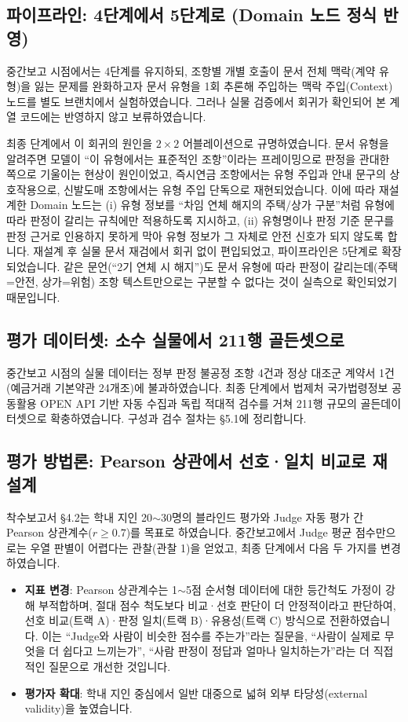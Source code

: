 \documentclass[10pt,a4paper]{article}
\begin{document}
\subsection{파이프라인: 4단계에서 5단계로 (Domain 노드 정식 반영)}
중간보고 시점에서는 4단계를 유지하되, 조항별 개별 호출이 문서 전체 맥락(계약 유형)을 잃는 문제를 완화하고자 문서 유형을 1회 추론해 주입하는 맥락 주입(Context) 노드를 별도 브랜치에서 실험하였습니다. 그러나 실물 검증에서 회귀가 확인되어 본 계열 코드에는 반영하지 않고 보류하였습니다.

최종 단계에서 이 회귀의 원인을 $2\times2$ 어블레이션으로 규명하였습니다. 문서 유형을 알려주면 모델이 ``이 유형에서는 표준적인 조항''이라는 프레이밍으로 판정을 관대한 쪽으로 기울이는 현상이 원인이었고, 즉시연금 조항에서는 유형 주입과 안내 문구의 상호작용으로, 신발도매 조항에서는 유형 주입 단독으로 재현되었습니다. 이에 따라 재설계한 Domain 노드는 (i) 유형 정보를 ``차임 연체 해지의 주택/상가 구분''처럼 유형에 따라 판정이 갈리는 규칙에만 적용하도록 지시하고, (ii) 유형명이나 판정 기준 문구를 판정 근거로 인용하지 못하게 막아 유형 정보가 그 자체로 안전 신호가 되지 않도록 합니다. 재설계 후 실물 문서 재검에서 회귀 없이 편입되었고, 파이프라인은 5단계로 확장되었습니다. 같은 문언(``2기 연체 시 해지'')도 문서 유형에 따라 판정이 갈리는데(주택=안전, 상가=위험) 조항 텍스트만으로는 구분할 수 없다는 것이 실측으로 확인되었기 때문입니다.

\subsection{평가 데이터셋: 소수 실물에서 211행 골든셋으로}
중간보고 시점의 실물 데이터는 정부 판정 불공정 조항 4건과 정상 대조군 계약서 1건(예금거래 기본약관 24개조)에 불과하였습니다. 최종 단계에서 법제처 국가법령정보 공동활용 OPEN API 기반 자동 수집과 독립 적대적 검수를 거쳐 211행 규모의 골든데이터셋으로 확충하였습니다. 구성과 검수 절차는 \S5.1에 정리합니다.

\subsection{평가 방법론: Pearson 상관에서 선호·일치 비교로 재설계}
착수보고서 \S4.2는 학내 지인 20$\sim$30명의 블라인드 평가와 Judge 자동 평가 간 Pearson 상관계수($r \geq 0.7$)를 목표로 하였습니다. 중간보고에서 Judge 평균 점수만으로는 우열 판별이 어렵다는 관찰(관찰 1)을 얻었고, 최종 단계에서 다음 두 가지를 변경하였습니다.
\begin{itemize}
\item \textbf{지표 변경}: Pearson 상관계수는 1$\sim$5점 순서형 데이터에 대한 등간척도 가정이 강해 부적합하며, 절대 점수 척도보다 비교·선호 판단이 더 안정적이라고 판단하여, 선호 비교(트랙 A)·판정 일치(트랙 B)·유용성(트랙 C) 방식으로 전환하였습니다. 이는 ``Judge와 사람이 비슷한 점수를 주는가''라는 질문을, ``사람이 실제로 무엇을 더 쉽다고 느끼는가'', ``사람 판정이 정답과 얼마나 일치하는가''라는 더 직접적인 질문으로 개선한 것입니다.
\item \textbf{평가자 확대}: 학내 지인 중심에서 일반 대중으로 넓혀 외부 타당성(external validity)을 높였습니다.
\end{itemize}
\end{document}
